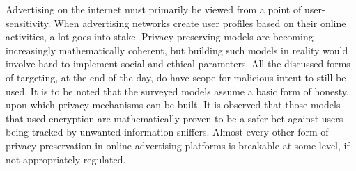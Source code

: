 \documentclass[sigconf,nonacm]{acmart}
\begin{document}
Advertising on the internet must primarily be viewed from a point of user-sensitivity. When advertising networks create user profiles based on their online activities, a lot goes into stake. Privacy-preserving models are becoming increasingly mathematically coherent, but building such models in reality would involve hard-to-implement social and ethical parameters. All the discussed forms of targeting, at the end of the day, do have scope for malicious intent to still be used. It is to be noted that the surveyed models assume a basic form of honesty, upon which privacy mechanisms can be built.  It is observed that those models that used encryption are mathematically proven to be a safer bet against users being tracked by unwanted information sniffers. Almost every other form of privacy-preservation in online advertising platforms is breakable at some level, if not appropriately regulated.




%






\appendix
\end{document}
